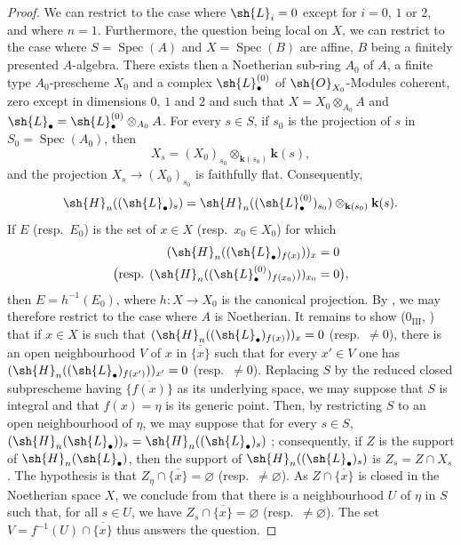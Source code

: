 \begin{proof}
\label{IV.9.9.6-proof}
We can restrict to the case where $\sh{L}_i=0$ except for $i=0$, $1$ or $2$, and where $n=1$.
Furthermore, the question being local on $X$, we can restrict to the case where $S=\operatorname{Spec}(A)$ and $X=\operatorname{Spec}(B)$ are affine, $B$ being a finitely presented $A$-algebra.
There exists then a Noetherian sub-ring $A_0$ of $A$, a finite type $A_0$-prescheme $X_0$ and a complex $\sh{L}_\bullet^{(0)}$ of $\sh{O}_{X_0}$-Modules coherent, zero except in dimensions $0$, $1$ and $2$ and such that $X=X_0\otimes_{A_0}A$ and $\sh{L}_\bullet=\sh{L}_\bullet^{(0)}\otimes_{A_0}A$.
For every $s\in S$, if $s_0$ is the projection of $s$ in $S_0=\operatorname{Spec}(A_0)$, then
\[
  X_s=(X_0)_{s_0}\otimes_{\mathbf{k}(s_0)}\mathbf{k}(s),
\]
and the projection $X_s\to(X_0)_{s_0}$ is faithfully flat.
Consequently,
\[
  \sh{H}_n((\sh{L}_\bullet)_s)
  =\sh{H}_n((\sh{L}_\bullet^{(0)})_{s_0})\otimes_{\mathbf{k}(s_0)}\mathbf{k}(s).
\]
If $E$ (resp.~$E_0$) is the set of $x\in X$ (resp.~$x_0\in X_0$) for which
\[
  \begin{aligned}
  (\sh{H}_n((\sh{L}_\bullet)_{f(x)}))_x&=0\\
  \bigl(\text{resp. }(\sh{H}_n((\sh{L}_\bullet^{(0)})_{f(x_0)}))_{x_0}&=0\bigr),
  \end{aligned}
\]
then $E=h^{-1}(E_0)$, where $h:X\to X_0$ is the canonical projection.
By , we may therefore restrict to the case where $A$ is Noetherian.
It remains to show ($0_{\mathrm{III}}$, ) that if $x\in X$ is such that $(\sh{H}_n((\sh{L}_\bullet)_{f(x)}))_x=0$ (resp.~$\neq 0$), there is an open neighbourhood $V$ of $x$ in $\overline{\{x\}}$ such that for every $x'\in V$ one has $(\sh{H}_n((\sh{L}_\bullet)_{f(x')}))_{x'}=0$ (resp.~$\neq 0$).
Replacing $S$ by the reduced closed subprescheme having $\overline{\{f(x)\}}$ as its underlying space, we may suppose that $S$ is integral and that $f(x)=\eta$ is its generic point.
Then, by restricting $S$ to an open neighbourhood of $\eta$, we may suppose that for every $s\in S$,
$(\sh{H}_n(\sh{L}_\bullet))_s=\sh{H}_n((\sh{L}_\bullet)_s)$ ; consequently, if $Z$ is the support of $\sh{H}_n(\sh{L}_\bullet)$, then the support of $\sh{H}_n((\sh{L}_\bullet)_s)$ is $Z_s=Z\cap X_s$ .
The hypothesis is that $Z_\eta\cap\overline{\{x\}}=\varnothing$ (resp.~$\neq\varnothing$).
As $Z\cap\overline{\{x\}}$ is closed in the Noetherian space $X$, we conclude from  that there is a neighbourhood $U$ of $\eta$ in $S$ such that, for all $s\in U$, we have $Z_s\cap\overline{\{x\}}=\varnothing$ (resp.~$\neq\varnothing$).
The set $V=f^{-1}(U)\cap\overline{\{x\}}$ thus answers the question.
\end{proof}
